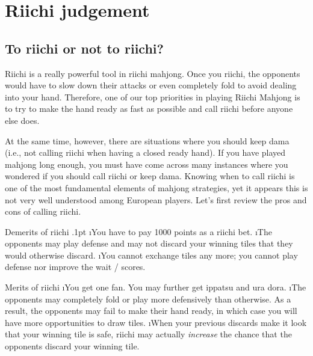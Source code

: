 
\chapter{Riichi judgement} \label{ch:riichi}

\section{To {\jap riichi} or not to {\jap riichi}?}
{\jap Riichi} is a really powerful tool in riichi mahjong. Once you {\jap riichi}, the opponents would have to slow down their attacks or even completely fold to avoid dealing into your hand. Therefore, one of our top priorities in playing Riichi Mahjong is to try to make the hand ready as fast as possible and call {\jap riichi} before anyone else does.

\bigskip
At the same time, however, there are situations where you should keep {\jap dama} (i.e., not calling {\jap riichi} when having a closed ready hand). If you have played mahjong long enough, you must have come across many instances where you wondered if you should call {\jap riichi} or keep {\jap dama}. 
Knowing when to call {\jap riichi} is one of the most fundamental elements of mahjong strategies, yet it appears this is not very well understood among European players. 
Let's first review the pros and cons of calling {\jap riichi}. 

\begin{itembox}[c]{Demerits of {\jap riichi}}
	\bi \itemsep.1pt
	\i You have to pay 1000 points as a {\jap riichi} bet.
	\i The opponents may play defense and may not discard your winning tiles that they would otherwise discard.
	\i You cannot exchange tiles any more; you cannot play defense nor improve the wait / scores.
	\ei
\end{itembox}

\begin{itembox}[c]{Merits of {\jap riichi}}
	\bi
	\i You get one {\jap fan}. You may further get {\jap ippatsu} and {\jap ura dora}.
	\i The opponents may completely fold or play more defensively than otherwise. As a result, the opponents may fail to make their hand ready, in which case you will have more opportunities to draw tiles. 
	\i When your previous discards make it look that your winning tile is safe, {\jap riichi} may actually \emph{increase} the chance that the opponents discard your winning tile. 
	\ei
\end{itembox}

